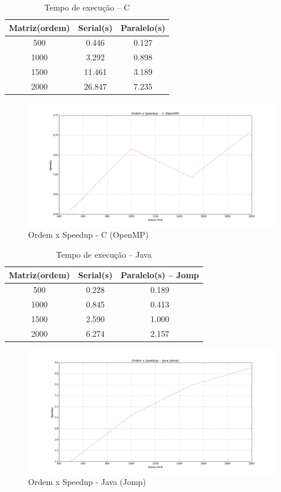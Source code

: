\documentclass[a4paper,12pt]{article}
\begin{document}
\begin{table}
  \centering
  \caption{Tempo de execução -- C}
  \begin{tabular}{ccc}
    \hline
    Matriz(ordem) & Serial(s) & Paralelo(s)\\
    \hline
    \hline
    500 & 0.446 & 0.127\\
    1000 & 3.292 & 0.898\\
    1500 & 11.461 & 3.189\\
    2000 & 26.847 & 7.235\\
    \hline
  \end{tabular}
  \label{tab:timec}
\end{table}


\begin{figure}[!htb]
  \centering
  \includegraphics[width=15.0cm]{pictures/speedup_C.png}
  \caption{Ordem x Speedup - C (OpenMP)}
\label{fig:speedup_C}
\end{figure}



\begin{table}
  \centering
  \caption{Tempo de execução -- Java}
  \begin{tabular}{ccc}
    \hline
    Matriz(ordem) & Serial(s) & Paralelo(s) -- Jomp\\
    \hline
    \hline
    500 & 0.228 & 0.189\\
    1000 & 0.845 & 0.413\\
    1500 & 2.590 & 1.000\\
    2000 & 6.274 & 2.157\\
    \hline
  \end{tabular}
  \label{tab:timeJava}
\end{table}

\begin{figure}[!htb]
  \centering
  \includegraphics[width=15.0cm]{pictures/speedup_Java.png}
  \caption{Ordem x Speedup - Java (Jomp)}
\label{fig:speedup_Java}
\end{figure}
\end{document}
